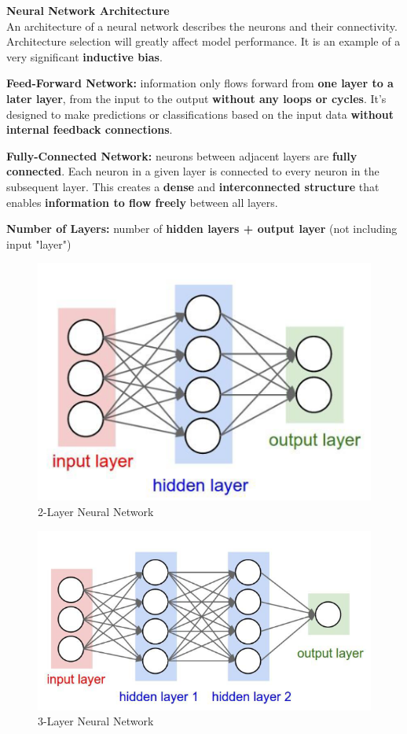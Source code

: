 \noindent\textbf{Neural Network Architecture}\\
An architecture of a neural network describes the neurons and their connectivity. Architecture selection will greatly affect model performance. It is an example of a very significant \textbf{inductive bias}.
\begin{definition}
\textbf{Feed-Forward Network:} information only flows forward from \textbf{one layer to a later layer}, from the input to the output \textbf{without any loops or cycles}. It's designed to make predictions or classifications based on the input data \textbf{without internal feedback connections}.
\end{definition}
\begin{definition}
\textbf{Fully-Connected Network:} neurons between adjacent layers are \textbf{fully connected}. Each neuron in a given layer is connected to every neuron in the subsequent layer. This creates a \textbf{dense} and \textbf{interconnected structure} that enables \textbf{information to flow freely} between all layers.
\end{definition}
\begin{definition}
\textbf{Number of Layers:} number of \textbf{hidden layers + output layer} (not including input "layer")
\end{definition}

\begin{figure}[h!t]
    \centering
    \includegraphics[width=0.3\linewidth]{twolayerNN.png}
    \caption{2-Layer Neural Network}
    \label{fig:enter-label}
\end{figure}
\begin{figure}[h!t]
    \centering
    \includegraphics[width=0.325\linewidth]{threelayerNN.png}
    \caption{3-Layer Neural Network}
    \label{fig:enter-label}
\end{figure}

